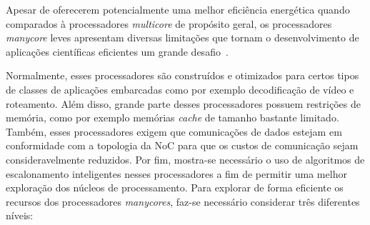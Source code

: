 \documentclass[a4paper,11pt]{article}
\begin{document}
Apesar de oferecerem potencialmente uma melhor eficiência energética quando comparados à processadores \emph{multicore} de propósito geral, os processadores \emph{manycore} leves apresentam diversas limitações que tornam o desenvolvimento de aplicações científicas eficientes um grande desafio~\cite{Castro:2013:ACE:2535753.2535757}.

Normalmente, esses processadores são construídos e otimizados para certos tipos de classes de aplicações embarcadas como por exemplo decodificação de vídeo e roteamento. Além disso, grande parte desses processadores possuem restrições de memória, como por exemplo memórias \emph{cache} de tamanho bastante limitado. Também, esses processadores exigem que comunicações de dados estejam em conformidade com a topologia da NoC para que os custos de comunicação sejam consideravelmente reduzidos. Por fim, mostra-se necessário o uso de algoritmos de escalonamento inteligentes nesses processadores a fim de permitir uma melhor exploração dos núcleos de processamento. Para explorar de forma eficiente os recursos dos processadores \emph{manycores}, faz-se necessário considerar três diferentes níveis:
\end{document}
